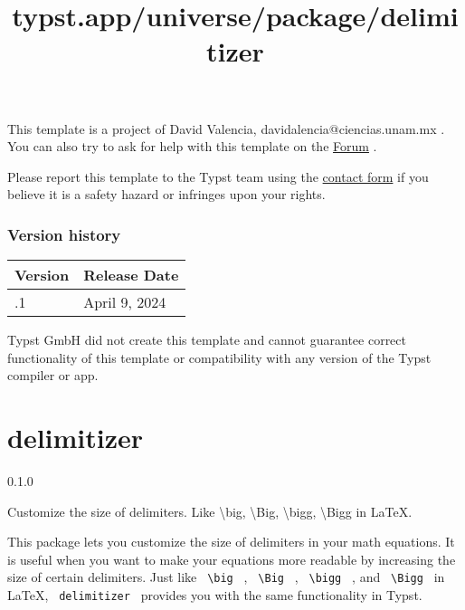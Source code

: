 This template is a project of David Valencia,
davidalencia@ciencias.unam.mx . You can also try to ask for help with
this template on the \href{https://forum.typst.app}{Forum} .

Please report this template to the Typst team using the
\href{https://typst.app/contact}{contact form} if you believe it is a
safety hazard or infringes upon your rights.

\label{versions}
\subsubsection{Version history}\label{version-history}

\begin{longtable}[]{@{}ll@{}}
\toprule\noalign{}
Version & Release Date \\
\midrule\noalign{}
\endhead
\bottomrule\noalign{}
\endlastfoot
0.1.1 & April 9, 2024 \\
\end{longtable}

Typst GmbH did not create this template and cannot guarantee correct
functionality of this template or compatibility with any version of the
Typst compiler or app.


\title{typst.app/universe/package/delimitizer}

\label{banner}
\section{delimitizer}\label{delimitizer}

{ 0.1.0 }

Customize the size of delimiters. Like \textbackslash big,
\textbackslash Big, \textbackslash bigg, \textbackslash Bigg in LaTeX.

\label{readme}
This package lets you customize the size of delimiters in your math
equations. It is useful when you want to make your equations more
readable by increasing the size of certain delimiters. Just like
\texttt{\ \textbackslash{}big\ } , \texttt{\ \textbackslash{}Big\ } ,
\texttt{\ \textbackslash{}bigg\ } , and
\texttt{\ \textbackslash{}Bigg\ } in LaTeX, \texttt{\ delimitizer\ }
provides you with the same functionality in Typst.

